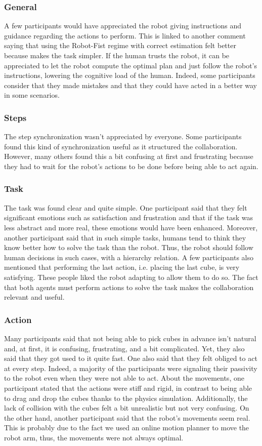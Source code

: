 \subsubsection{General}
A few participants would have appreciated the robot giving instructions and guidance regarding the actions to perform. This is linked to another comment saying that using the Robot-Fist regime with correct estimation felt better because makes the task simpler. If the human trusts the robot, it can be appreciated to let the robot compute the optimal plan and just follow the robot's instructions, lowering the cognitive load of the human. Indeed, some participants consider that they made mistakes and that they could have acted in a better way in some scenarios. 

\subsubsection{Steps}
The step synchronization wasn't appreciated by everyone. Some participants found this kind of synchronization useful as it structured the collaboration. However, many others found this a bit confusing at first and frustrating because they had to wait for the robot's actions to be done before being able to act again.

\subsubsection{Task}
The task was found clear and quite simple. One participant said that they felt significant emotions such as satisfaction and frustration and that if the task was less abstract and more real, these emotions would have been enhanced. Moreover, another participant said that in such simple tasks, humans tend to think they know better how to solve the task than the robot. Thus, the robot should follow human decisions in such cases, with a hierarchy relation. A few participants also mentioned that performing the last action, i.e. placing the last cube, is very satisfying. These people liked the robot adapting to allow them to do so. 
The fact that both agents must perform actions to solve the task makes the collaboration relevant and useful. 

\subsubsection{Action}
Many participants said that not being able to pick cubes in advance isn't natural and, at first, it is confusing, frustrating, and a bit complicated. Yet, they also said that they got used to it quite fast. One also said that they felt obliged to act at every step. Indeed, a majority of the participants were signaling their passivity to the robot even when they were not able to act. 
About the movements, one participant stated that the actions were stiff and rigid, in contrast to being able to drag and drop the cubes thanks to the physics simulation. Additionally, the lack of collision with the cubes felt a bit unrealistic but not very confusing.
On the other hand, another participant said that the robot's movements seem real. This is probably due to the fact we used an online motion planner to move the robot arm, thus, the movements were not always optimal.


